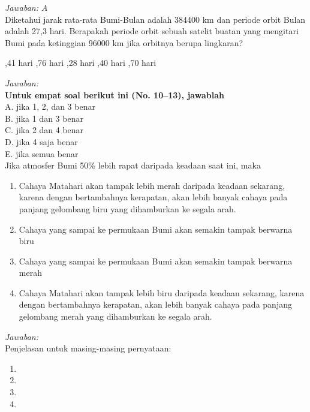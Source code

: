 \documentclass[11pt,fleqn, a4paper]{exam}
\begin{document}
\begin{questions}
\textit{Jawaban: A}\\


\vspace{0.5cm}
\question Diketahui jarak rata-rata Bumi-Bulan adalah 384400 km dan periode orbit Bulan adalah 27,3 hari. Berapakah periode orbit sebuah satelit buatan yang mengitari Bumi pada ketinggian 96000 km jika orbitnya berupa lingkaran?
\begin{choices}
,41 hari
,76 hari
,28 hari
,40 hari
,70 hari
\end{choices}

\textit{Jawaban: }\\



\vspace{1cm}
\textbf{Untuk empat soal berikut ini (No. 10\---13), jawablah}\\
A. jika 1, 2, dan 3 benar\\
B. jika 1 dan 3 benar\\
C. jika 2 dan 4 benar\\
D. jika 4 saja benar\\
E. jika semua benar\\

\vspace{0.5cm}
\question Jika atmosfer Bumi 50\% lebih rapat daripada keadaan saat ini, maka
\begin{enumerate}
\item Cahaya Matahari akan tampak lebih merah daripada keadaan sekarang, karena dengan bertambahnya kerapatan, akan lebih banyak cahaya pada panjang gelombang biru yang dihamburkan ke segala arah.
\item Cahaya yang sampai ke permukaan Bumi akan semakin tampak berwarna biru 
\item Cahaya yang sampai ke permukaan Bumi akan semakin tampak berwarna merah 
\item Cahaya Matahari akan tampak lebih biru daripada keadaan sekarang, karena dengan bertambahnya kerapatan, akan lebih banyak cahaya pada panjang gelombang merah yang dihamburkan ke segala arah.
\end{enumerate}

\textit{Jawaban: }\\
Penjelasan untuk masing-masing pernyataan:
\begin{enumerate}
\item 
\item 
\item 
\item 
\end{enumerate}



\end{questions}
\end{document}
